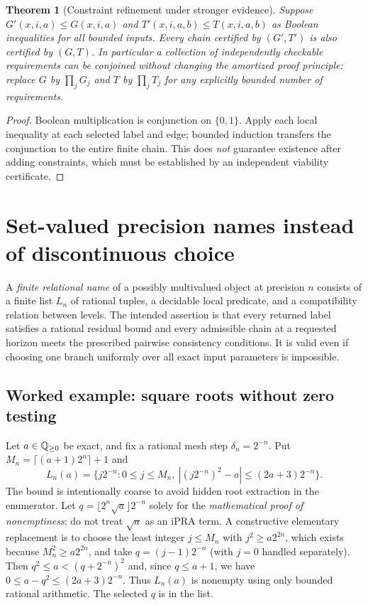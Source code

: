 \documentclass[11pt]{article}
\newtheorem{theorem}{Theorem}[section]\newtheorem{lemma}[theorem]{Lemma}\newtheorem{proposition}[theorem]{Proposition}\newtheorem{definition}[theorem]{Definition}\newtheorem{remark}[theorem]{Remark}
\begin{document}
\begin{theorem}[Constraint refinement under stronger evidence]
Suppose $G'(x,i,a)\le G(x,i,a)$ and $T'(x,i,a,b)\le T(x,i,a,b)$ as Boolean inequalities for all bounded inputs. Every chain certified by $(G',T')$ is also certified by $(G,T)$. In particular a collection of independently checkable requirements can be conjoined without changing the amortized proof principle: replace $G$ by $\prod_j G_j$ and $T$ by $\prod_j T_j$ for any explicitly bounded number of requirements.
\end{theorem}
\begin{proof}
Boolean multiplication is conjunction on $\{0,1\}$. Apply each local inequality at each selected label and edge; bounded induction transfers the conjunction to the entire finite chain. This does \emph{not} guarantee existence after adding constraints, which must be established by an independent viability certificate.
\end{proof}

\section{Set-valued precision names instead of discontinuous choice}
A \emph{finite relational name} of a possibly multivalued object at precision $n$ consists of a finite list $L_n$ of rational tuples, a decidable local predicate, and a compatibility relation between levels. The intended assertion is that every returned label satisfies a rational residual bound and every admissible chain at a requested horizon meets the prescribed pairwise consistency conditions. It is valid even if choosing one branch uniformly over all exact input parameters is impossible.

\subsection{Worked example: square roots without zero testing}
Let $a\in\mathbb Q_{\ge0}$ be exact, and fix a rational mesh step $\delta_n=2^{-n}$. Put $M_n=\lceil (a+1)2^n\rceil+1$ and
\[L_n(a)=\{j2^{-n}:0\le j\le M_n,\ |(j2^{-n})^2-a|\le (2a+3)2^{-n}\}.\]
The bound is intentionally coarse to avoid hidden root extraction in the enumerator. Let $q=\lfloor 2^n\sqrt a\rfloor 2^{-n}$ solely for the \emph{mathematical proof of nonemptiness}; do not treat $\sqrt a$ as an iPRA term. A constructive elementary replacement is to choose the least integer $j\le M_n$ with $j^2\ge a2^{2n}$, which exists because $M_n^2\ge a2^{2n}$, and take $q=(j-1)2^{-n}$ (with $j=0$ handled separately). Then $q^2\le a<(q+2^{-n})^2$ and, since $q\le a+1$, we have $0\le a-q^2\le(2a+3)2^{-n}$. Thus $L_n(a)$ is nonempty using only bounded rational arithmetic. The selected $q$ is in the list.
\end{document}
